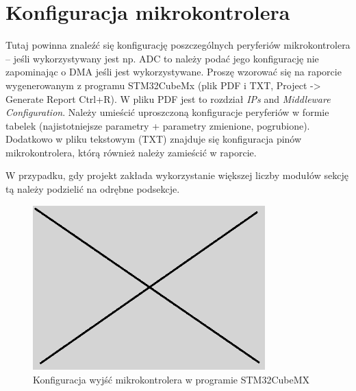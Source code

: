 \documentclass[10pt, a4paper]{article}
\begin{document}
\section{Konfiguracja mikrokontrolera}

Tutaj powinna znaleźć się konfigurację poszczególnych peryferiów 
mikrokontrolera -- jeśli wykorzystywany jest np. ADC to należy 
podać jego konfigurację nie zapominając o DMA jeśli jest 
wykorzystywane. Proszę wzorować się na raporcie wygenerowanym 
z programu STM32CubeMx 
(plik PDF i TXT, Project -> Generate Report Ctrl+R). 
W pliku PDF jest to rozdział \textit{IPs} and \textit{Middleware Configuration}. 
Należy umieścić uproszczoną konfiguracje peryferiów w formie 
tabelek (najistotniejsze parametry + parametry zmienione, pogrubione).
Dodatkowo w pliku tekstowym (TXT) znajduje się konfiguracja pinów 
mikrokontrolera, którą również należy zamieścić w raporcie.

W przypadku, gdy projekt zakłada wykorzystanie większej liczby modułów
sekcję tą należy podzielić na odrębne podsekcje.

\begin{figure}[H]
	\centering
	\includegraphics[width=0.8\textwidth]{figures/obraz.png}
	\caption{Konfiguracja wyjść mikrokontrolera w programie STM32CubeMX}
	\label{fig:KonfiguracjaMikrokontrolera}
\end{figure}
\end{document}
